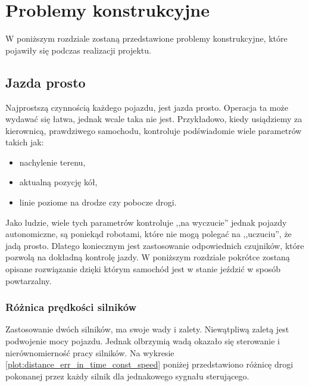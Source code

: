 \section{Problemy konstrukcyjne}
\label{sec:problemy_konstrukcyjne}
    W poniższym rozdziale zostaną przedstawione problemy konstrukcyjne,
    które pojawiły się podczas realizacji projektu.

    \subsection{Jazda prosto}
    \label{section:jazda_prosto}
        Najprostszą czynnością każdego pojazdu, jest jazda prosto.
        Operacja ta może wydawać się łatwa, jednak wcale taka nie jest.
        Przykładowo, kiedy usiądziemy za kierownicą, prawdziwego samochodu, kontroluje podświadomie wiele parametrów takich jak:
        \begin{itemize}
            \item nachylenie terenu,
            \item aktualną pozycję kół,
            \item linie poziome na drodze czy pobocze drogi.
        \end{itemize}
        Jako ludzie, wiele tych parametrów kontroluje ,,na wyczucie'' jednak pojazdy autonomiczne, są poniekąd robotami, które nie mogą polegać na ,,uczuciu'', że jadą prosto.
        Dlatego koniecznym jest zastosowanie odpowiednich czujników, które pozwolą na dokładną kontrolę jazdy.
        W poniższym rozdziale pokrótce zostaną opisane rozwiązanie dzięki którym samochód jest w stanie jeździć w sposób powtarzalny.

        \subsubsection{Różnica prędkości silników}
            Zastosowanie dwóch silników, ma swoje wady i zalety.
            Niewątpliwą zaletą jest podwojenie mocy pojazdu.
            Jednak olbrzymią wadą okazało się sterowanie i nierównomierność pracy silników.
            Na wykresie \ref{plot:distance_err_in_time_const_speed} poniżej przedstawiono różnicę drogi pokonanej przez każdy silnik dla jednakowego sygnału sterującego.

